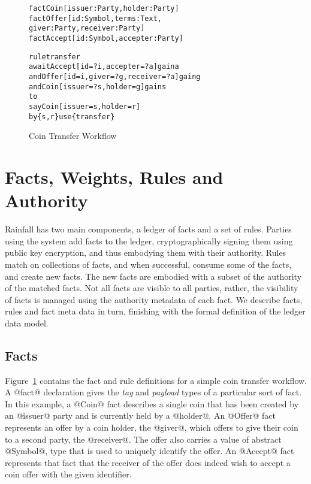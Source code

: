 
\clearpage{}


\begin{figure}
\begin{small}
\begin{alltt}
fact  Coin   [issuer: Party, holder: Party]
fact  Offer  [id: Symbol,   terms: Text,
              giver: Party, receiver: Party ]
fact  Accept [id: Symbol,   accepter: Party]

rule  transfer
await Accept [id = ?i, accepter = ?a]  gain a
  and Offer  [id = i,  giver = ?g, receiver = ?a] gain g
  and Coin   [issuer = ?s, holder = g] gain s
to
  say Coin   [issuer = s, holder = r]
   by \{s, r\} use \{transfer\}
\end{alltt}
\end{small}
\caption{Coin Transfer Workflow}
\label{f:CoinTransfer}
\end{figure}


\section{Facts, Weights, Rules and Authority}
\label{s:FactsWeights}
Rainfall has two main components, a ledger of facts and a set of rules. Parties using the system add facts to the ledger, cryptographically signing them using public key encryption, and thus embodying them with their authority. Rules match on collections of facts, and when successful, consume some of the facts, and create new facts. The new facts are embodied with a subset of the authority of the matched facts. Not all facts are visible to all parties, rather, the visibility of facts is managed using the authority metadata of each fact. We describe facts, rules and fact meta data in turn, finishing with the formal definition of the ledger data model.


\subsection{Facts}
\label{s:Facts}
Figure~\ref{f:CoinTransfer} contains the fact and rule definitions for a simple coin transfer workflow. A @fact@ declaration gives the \emph{tag} and \emph{payload} types of a particular sort of fact. In this example, a @Coin@ fact describes a single coin that has been created by an @issuer@ party and is currently held by a @holder@. An @Offer@ fact represents an offer by a coin holder, the @giver@, which offers to give their coin to a second party, the @receiver@. The offer also carries a value of abstract @Symbol@, type that is used to uniquely identify the offer. An @Accept@ fact represents that fact that the receiver of the offer does indeed wish to accept a coin offer with the given identifier.

